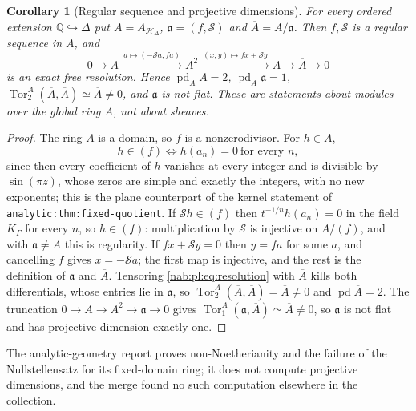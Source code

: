 \documentclass[11pt,letterpaper]{article}
\newtheorem{corollary}[corollary]{Corollary}
\theoremstyle{definition}
\theoremstyle{remark}
\newcommand{\Q}{\mathbb Q}
\newcommand{\K}{K_\Gamma}
\newcommand{\HD}{\mathscr H_\Delta}
\newcommand{\Tor}{\operatorname{Tor}}
\numberwithin{equation}{section}
\begin{document}
\begin{corollary}[Regular sequence and projective dimensions]
\label{nab:pl:cor:homological}
For every ordered extension $\Q\hookrightarrow\Delta$ put $A=A_{\HD}$,
$\mathfrak a=(f,\mathcal S)$ and $\overline A=A/\mathfrak a$. Then $f,\mathcal S$
is a regular sequence in $A$, and
\begin{equation}\label{nab:pl:eq:resolution}
 0\longrightarrow A\xrightarrow{\ a\mapsto(-\mathcal Sa,fa)\ }A^2
 \xrightarrow{\ (x,y)\mapsto fx+\mathcal Sy\ }A\longrightarrow\overline A
 \longrightarrow0
\end{equation}
is an exact free resolution. Hence $\operatorname{pd}_A\overline A=2$,
$\operatorname{pd}_A\mathfrak a=1$, $\Tor^A_2(\overline A,\overline A)\simeq
\overline A\neq0$, and $\mathfrak a$ is not flat. These are statements about
modules over the global ring $A$, not about sheaves.
\end{corollary}

\begin{proof}
The ring $A$ is a domain, so $f$ is a nonzerodivisor. For $h\in A$,
\begin{equation}\label{nab:pl:eq:dividesine}
 h\in(f)\iff h(a_n)=0\ \text{for every }n,
\end{equation}
since then every coefficient of $h$ vanishes at every integer and is divisible
by $\sin(\pi z)$, whose zeros are simple and exactly the integers, with no new
exponents; this is the plane counterpart of the kernel statement of
\nolinkurl{analytic:thm:fixed-quotient}. If $\mathcal Sh\in(f)$ then
$t^{-1/n}h(a_n)=0$ in the field $\K$ for every $n$, so $h\in(f)$: multiplication
by $\mathcal S$ is injective on $A/(f)$, and with $\mathfrak a\neq A$ this is
regularity. If $fx+\mathcal Sy=0$ then $y=fa$ for some $a$, and cancelling $f$
gives $x=-\mathcal Sa$; the first map is injective, and the rest is the
definition of $\mathfrak a$ and $\overline A$. Tensoring
\eqref{nab:pl:eq:resolution} with $\overline A$ kills both differentials,
whose entries lie in $\mathfrak a$, so $\Tor_2^A(\overline A,\overline A)=
\overline A\neq0$ and $\operatorname{pd}\overline A=2$. The truncation
$0\to A\to A^2\to\mathfrak a\to0$ gives $\Tor_1^A(\mathfrak a,\overline A)
\simeq\overline A\neq0$, so $\mathfrak a$ is not flat and has projective
dimension exactly one.
\end{proof}

The analytic-geometry report proves non-Noetherianity and the failure of the
Nullstellensatz for its fixed-domain ring; it does not compute projective
dimensions, and the merge found no such computation elsewhere in the
collection.
\end{document}
